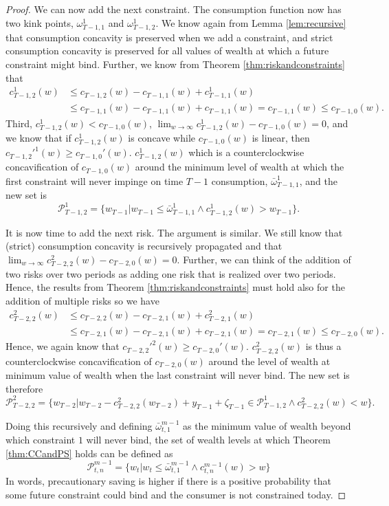 \documentclass[titlepage]{\econtex}
\providecommand{\wAlt}{\omega}
\begin{document}
\begin{proof}
    We can now add the next constraint. The consumption function now has two kink points, $\wAlt_{T-1,1}^1$ and $\wAlt_{T-1,2}^1$. We know again from Lemma \ref{lem:recursive} that consumption concavity is preserved when we add a constraint, and strict consumption concavity is preserved for all values of wealth at which a future constraint might bind. Further, we know from Theorem \ref{thm:riskandconstraints} that 
    \begin{align*}c_{T-1,2}^1(w) &\leq c_{T-1,2}(w) - c_{T-1,1}(w) + c_{T-1,1}^1(w) \\ &\leq c_{T-1,1}(w) - c_{T-1,1}(w) + c_{T-1,1}(w) = c_{T-1,1}(w) \leq c_{T-1,0}(w). \end{align*}
    Third, $c_{T-1,2}^1(w) < c_{T-1,0}(w)$,  $\lim_{w\rightarrow\infty} c_{T-1,2}^1(w) - c_{T-1,0}(w) = 0$, and we know that if $c_{T-1,2}^1(w)$ is concave while $c_{T-1,0}(w)$ is linear, then $c_{T-1,2}'^{1}(w) \geq c_{T-1,0}'(w)$. $c_{T-1,2}^1(w)$ which is a counterclockwise concavification of $c_{T-1,0}(w)$ around the minimum level of wealth at which the first constraint will never impinge on time $T-1$ consumption, $\bar{\wAlt}_{T-1,1}^1$, and the new set is
    \[\mathcal{P}_{T-1,2}^1 = \{w_{T-1}| w_{T-1} \leq \bar{\wAlt}_{T-1,1}^1 \wedge c_{T-1,2}^1(w) > w_{T-1} \}.\]
    
    It is now time to add the next risk. The argument is similar. We still know that (strict) consumption concavity is recursively propagated and that $\lim_{w\rightarrow \infty} c_{T-2,2}^2(w) - c_{T-2,0}(w) = 0$. Further, we can think of the addition of two risks over two periods as adding one risk that is realized over two periods. Hence, the results from Theorem \ref{thm:riskandconstraints} must hold also for the addition of multiple risks so we have
    \begin{align*}c_{T-2,2}^2(w) &\leq c_{T-2,2}(w) - c_{T-2,1}(w) + c_{T-2,1}^2(w) \\ &\leq c_{T-2,1}(w) - c_{T-2,1}(w) + c_{T-2,1}(w) = c_{T-2,1}(w) \leq c_{T-2,0}(w). \end{align*}
    Hence, we again know that $c_{T-2,2}'^{2}(w) \geq c_{T-2,0}'(w)$. $c_{T-2,2}^2(w)$ is thus a counterclockwise concavification of $c_{T-2,0}(w)$ around the level of wealth at minimum value of wealth when the last constraint will never bind. The new set is therefore
    \[\mathcal{P}_{T-2,2}^2 = \{w_{T-2} | w_{T-2} - c_{T-2,2}^2(w_{T-2}) + {y}_{T-1} + \zeta_{T-1} \in \mathcal{P}_{T-1,2}^1 \wedge c_{T-2,2}^{2}(w) < w \}.\]
    
    
    Doing this recursively and defining $\bar{\wAlt}_{t,1}^{m-1}$ as the minimum value of wealth beyond which constraint $1$ will never bind, the set of wealth levels at which Theorem \ref{thm:CCandPS} holds can be defined as
    \[\mathcal{P}_{t,n}^{m-1} = \{w_t | w_t \leq \bar{\wAlt}_{t,1}^{m-1} \wedge c_{t,n}^{m-1}(w) > w \}\]
    In words, precautionary saving is higher if there is a positive probability that some future constraint could bind and the consumer is not constrained today. 
    

\end{proof}
\end{document}
